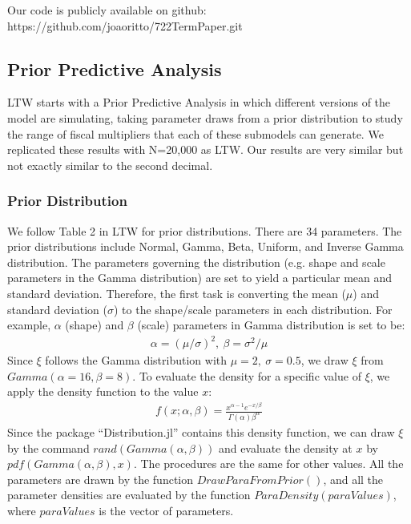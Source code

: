 \documentclass[letterpaper,12pt]{article}%
\begin{document}
Our code is publicly available on github: https://github.com/joaoritto/722TermPaper.git

\subsection{Prior Predictive Analysis}

LTW starts with a Prior Predictive Analysis in which different versions of the model are simulating, taking parameter draws from a prior distribution to study the range of fiscal multipliers that each of these submodels can generate. We replicated these results with N=20,000 as LTW. Our results are very similar but not exactly similar to the second decimal.

\subsubsection*{Prior Distribution}
We follow Table 2 in LTW for prior distributions. There are 34 parameters. The prior distributions include Normal, Gamma, Beta, Uniform, and Inverse Gamma distribution. The parameters  governing the distribution (e.g. shape and scale parameters in the Gamma distribution) are set to yield a particular mean and standard deviation. Therefore, the first task is converting the mean ($\mu$) and standard deviation ($\sigma$) to the shape/scale parameters in each distribution. For example, $\alpha$ (shape) and $\beta$ (scale) parameters in Gamma distribution is set to be:
\begin{align*}
\alpha = \left( \mu/\sigma  \right)^2, \ \beta = \sigma^2/\mu 
\end{align*}
Since $\xi$ follows the Gamma distribution with $\mu=2, \ \sigma=0.5$, we draw $\xi$ from $Gamma(\alpha=16, \beta=8)$. To evaluate the density for a specific value of $\xi$, we apply the density function to the value $x$:
\begin{align*}
f(x; \alpha, \beta) = \frac{x^{\alpha-1}  e^{-x/\beta }}{\Gamma(\alpha) \beta^\alpha}
\end{align*}
Since the package ``Distribution.jl'' contains this density function, we can draw $\xi$ by the command $rand(Gamma(\alpha,\beta))$ and evaluate the density at $x$ by $pdf(Gamma(\alpha,\beta), x )$. The procedures are the same for other values. All the parameters are drawn by the function $DrawParaFromPrior( )$, and all the parameter densities are evaluated by the function $ParaDensity(paraValues )$, where $paraValues$ is the vector of parameters.
\end{document}
